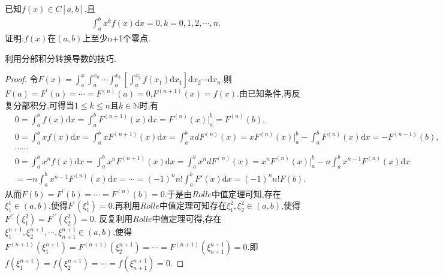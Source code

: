 \documentclass[../../main.tex]{subfiles}
\begin{document}
\begin{example}\label{example245574}
已知$f(x)\in C[a,b]$,且
\begin{align*}
\int_a^b{x^kf\left( x \right) \mathrm{d}x}=0, k=0,1,2,\cdots ,n .
\end{align*}
证明:$f(x)$在$(a,b)$上至少n+1个零点.
\end{example}
\begin{note}
利用分部积分转换导数的技巧.
\end{note}
\begin{proof}
令\(F(x)=\int_a^x\int_a^{x_n}\cdots\int_a^{x_3}\left[\int_a^{x_2}f(x_1)\mathrm{d}x_1\right]\mathrm{d}x_2\cdots \mathrm{d}x_n\).则\(F(a)=F^\prime(a)=\cdots=F^{(n)}(a)=0\),\(F^{(n + 1)}(x)=f(x)\).由已知条件,再反复分部积分,可得当\(1\leqslant k\leqslant n\)且\(k\in\mathbb{N}\)时,有
\begin{align*}
&0=\int_a^b{f\left( x \right) \mathrm{d}x}=\int_a^b{F^{\left( n+1 \right)}\left( x \right) \mathrm{d}x}=F^{\left( n \right)}\left( x \right) \Big|_{a}^{b}=F^{\left( n \right)}\left( b \right) ,
\\
&0=\int_a^b{xf\left( x \right) \mathrm{d}x}=\int_a^b{xF^{\left( n+1 \right)}\left( x \right) \mathrm{d}x}=\int_a^b{xdF^{\left( n \right)}\left( x \right)}=xF^{\left( n \right)}\left( x \right) \Big| _{a}^{b}-\int_a^b{F^{\left( n \right)}\left( x \right) \mathrm{d}x}=-F^{\left( n-1 \right)}\left( b \right) ,
\\
&\cdots \cdots 
\\
&0=\int_a^b{x^nf\left( x \right) \mathrm{d}x}=\int_a^b{x^nF^{\left( n+1 \right)}\left( x \right) \mathrm{d}x}=\int_a^b{x^ndF^{\left( n \right)}\left( x \right)}=x^nF^{\left( n \right)}\left( x \right) \Big| _{a}^{b}-n\int_a^b{x^{n-1}F^{\left( n \right)}\left( x \right) \mathrm{d}x}
\\
&=-n\int_a^b{x^{n-1}F^{\left( n \right)}\left( x \right) \mathrm{d}x}=\cdots =\left( -1 \right) ^nn!\int_a^b{F\prime\left( x \right) \mathrm{d}x}=\left( -1 \right) ^nn!F\left( b \right) .
\end{align*}
从而\(F(b)=F^\prime(b)=\cdots=F^{(n)}(b)=0\).于是由\(Rolle\)中值定理可知,存在\(\xi_1^1\in(a,b)\),使得\(F^\prime(\xi_1^1)=0\).再利用\(Rolle\)中值定理可知存在\(\xi_1^2,\xi_2^2\in(a,b)\),使得\(F^{\prime\prime}(\xi_1^2)=F^{\prime\prime}(\xi_2^2)=0\).
反复利用\(Rolle\)中值定理可得,存在\(\xi_1^{n + 1},\xi_2^{n + 1},\cdots,\xi_{n + 1}^{n + 1}\in(a,b)\),使得\(F^{(n + 1)}(\xi_1^{n + 1})=F^{(n + 1)}(\xi_2^{n + 1})=\cdots=F^{(n + 1)}(\xi_{n + 1}^{n + 1})=0\).即\(f(\xi_1^{n + 1})=f(\xi_2^{n + 1})=\cdots=f(\xi_{n + 1}^{n + 1})=0\).
\end{proof}
\end{document}
